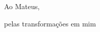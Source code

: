 \newpage

\vspace*{\fill}

{\large \hfill Ao Mateus,}

{\large \hfill pelas transformações em mim}

\newpage

$ $
